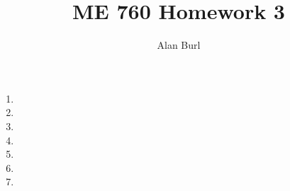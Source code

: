 \documentclass[12pt]{article}
\author{Alan Burl}
\title{ME 760 Homework 3}
\begin{document}
\maketitle
\clearpage
\begin{enumerate}
	\item \clearpage %
	\item \clearpage %
	\item \clearpage %
	\item \clearpage %
	\item \clearpage %
	\item \clearpage %
	\item \clearpage %

\end{enumerate}
\clearpage
\end{document}
